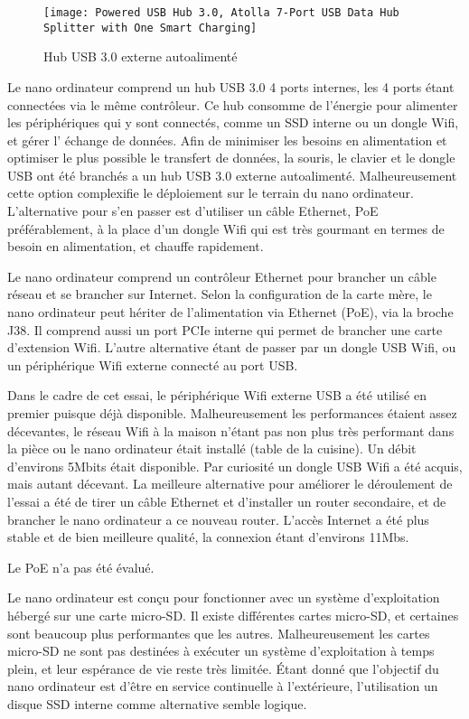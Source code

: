 \begin{figure}[H]
    \centering
    \texttt{[image: Powered USB Hub 3.0, Atolla 7-Port USB Data Hub Splitter with One Smart Charging]}
    \caption{Hub USB 3.0 externe autoalimenté}
    \label{fig:hubusb}
\end{figure}
\par Le nano ordinateur comprend un hub USB 3.0 4 ports internes, les 4 ports étant connectées via le même contrôleur. Ce hub consomme de l'énergie pour alimenter les périphériques qui y sont connectés, comme un SSD interne ou un dongle Wifi, et gérer l’ échange de données. Afin de minimiser les besoins en alimentation et optimiser le plus possible le transfert de données, la souris, le clavier et le dongle USB ont été branchés a un hub USB 3.0 externe autoalimenté. Malheureusement cette option complexifie le déploiement sur le terrain du nano ordinateur. L'alternative pour s'en passer est d'utiliser un câble Ethernet, PoE préférablement, à la place d'un dongle Wifi qui est très gourmant en termes de besoin en alimentation, et chauffe rapidement.
\par Le nano ordinateur comprend un contrôleur Ethernet pour brancher un câble réseau et se brancher sur Internet. Selon la configuration de la carte mère, le nano ordinateur peut hériter de l'alimentation via Ethernet (PoE), via la broche J38. Il comprend aussi un port PCIe interne qui permet de brancher une carte d'extension Wifi. L'autre alternative étant de passer par un dongle USB Wifi, ou un périphérique Wifi externe connecté au port USB. 
\par Dans le cadre de cet essai, le périphérique Wifi externe USB a été utilisé en premier puisque déjà disponible. Malheureusement les performances étaient assez décevantes, le réseau Wifi à la maison n'étant pas non plus très performant dans la pièce ou le nano ordinateur était installé (table de la cuisine). Un débit d'environs 5Mbits était disponible. Par curiosité un dongle USB Wifi a été acquis, mais autant décevant. La meilleure alternative pour améliorer le déroulement de l'essai a été de tirer un câble Ethernet et d'installer un router secondaire, et de brancher le nano ordinateur a ce nouveau router. L'accès Internet a été plus stable et de bien meilleure qualité, la connexion étant d'environs 11Mbs. 
\par Le PoE n'a pas été évalué. 
\par Le nano ordinateur est conçu pour fonctionner avec un système  d'exploitation hébergé sur une carte micro-SD. Il existe différentes cartes micro-SD, et certaines sont  beaucoup plus performantes que les autres. Malheureusement les cartes micro-SD ne sont pas destinées à exécuter un système d'exploitation à temps plein, et leur espérance de vie reste très limitée.  Étant donné que l'objectif du nano ordinateur est d'être en service continuelle à l'extérieure, l'utilisation un disque SSD interne comme alternative semble logique.
